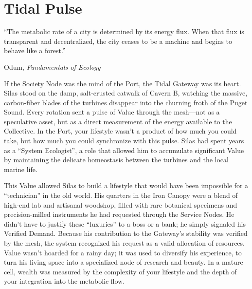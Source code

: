 \chapter{Tidal Pulse}
\label{chap:03}

\epigraph{“The metabolic rate of a city is determined by its energy flux. When that flux is transparent and decentralized, the city ceases to be a machine and begins to behave like a forest.”}{Odum, \textit{Fundamentals of Ecology}}


If the Society Node was the mind of the Port, the Tidal Gateway was its heart. Silas stood on the damp, salt-crusted catwalk of Cavern B, watching the massive, carbon-fiber blades of the turbines disappear into the churning froth of the Puget Sound. Every rotation sent a pulse of Value through the mesh—not as a speculative asset, but as a direct measurement of the energy available to the Collective. In the Port, your lifestyle wasn't a product of how much you could take, but how much you could synchronize with this pulse. Silas had spent years as a ``System Ecologist'', a role that allowed him to accumulate significant Value by maintaining the delicate homeostasis between the turbines and the local marine life.

This Value allowed Silas to build a lifestyle that would have been impossible for a ``technician'' in the old world. His quarters in the Iron Canopy were a blend of high-end lab and artisanal woodshop, filled with rare botanical specimens and precision-milled instruments he had requested through the Service Nodes. He didn't have to justify these ``luxuries'' to a boss or a bank; he simply signaled his Verified Demand. Because his contribution to the Gateway's stability was verified by the mesh, the system recognized his request as a valid allocation of resources. Value wasn't hoarded for a rainy day; it was used to diversify his experience, to turn his living space into a specialized node of research and beauty. In a mature cell, wealth was measured by the complexity of your lifestyle and the depth of your integration into the metabolic flow.

